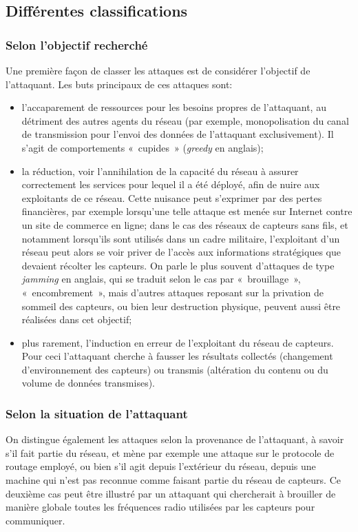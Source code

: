 \subsection{Différentes classifications}

    \subsubsection{Selon l'objectif recherché}
Une première façon de classer les attaques est de considérer l'objectif de l'attaquant.
Les buts principaux de ces attaques sont:
\begin{itemize}
    \item l'accaparement de ressources pour les besoins propres de l'attaquant, au détriment des autres agents du réseau (par exemple, monopolisation du canal de transmission pour l'envoi des données de l'attaquant exclusivement). Il s'agit de comportements « cupides » (\textit{greedy} en anglais);
    \item la réduction, voir l'annihilation de la capacité du réseau à assurer correctement les services pour lequel il a été déployé, afin de nuire aux exploitants de ce réseau. Cette nuisance peut s'exprimer par des pertes financières, par exemple lorsqu'une telle attaque est menée sur Internet contre un site de commerce en ligne; dans le cas des réseaux de capteurs sans fils, et notamment lorsqu'ils sont utilisés dans un cadre militaire, l'exploitant d'un réseau peut alors se voir priver de l'accès aux informations stratégiques que devaient récolter les capteurs. On parle le plus souvent d'attaques de type \textit{jamming} en anglais, qui se traduit selon le cas par « brouillage », « encombrement », mais d'autres attaques reposant sur la privation de sommeil des capteurs, ou bien leur destruction physique, peuvent aussi être réalisées dans cet objectif;
    \item plus rarement, l'induction en erreur de l'exploitant du réseau de capteurs. Pour ceci l'attaquant cherche à fausser les résultats collectés (changement d'environnement des capteurs) ou transmis (altération du contenu ou du volume de données transmises).
\end{itemize}

    \subsubsection{Selon la situation de l'attaquant}
On distingue également les attaques selon la provenance de l'attaquant, à savoir s'il fait partie du réseau, et mène par exemple une attaque sur le protocole de routage employé, ou bien s'il agit depuis l'extérieur du réseau, depuis une machine qui n'est pas reconnue comme faisant partie du réseau de capteurs.
Ce deuxième cas peut être illustré par un attaquant qui chercherait à brouiller de manière globale toutes les fréquences radio utilisées par les capteurs pour communiquer.

